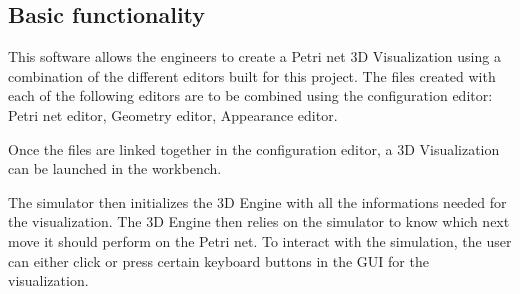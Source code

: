 \subsection{Basic functionality}


This software allows the engineers to create a Petri net 3D Visualization using a combination of the different editors built for this project.
The files created with each of the following editors are to be combined using the configuration editor: \newline
Petri net editor, Geometry editor, Appearance editor. 

Once the files are linked together in the configuration editor, a 3D Visualization can be launched in the workbench. \newline

The simulator then initializes the 3D Engine with all the informations needed for the visualization. The 3D Engine then relies on the simulator to know which next move it should perform on the Petri net. \newline
To interact with the simulation, the user can either click or press certain keyboard buttons in the GUI for the visualization. \newline


